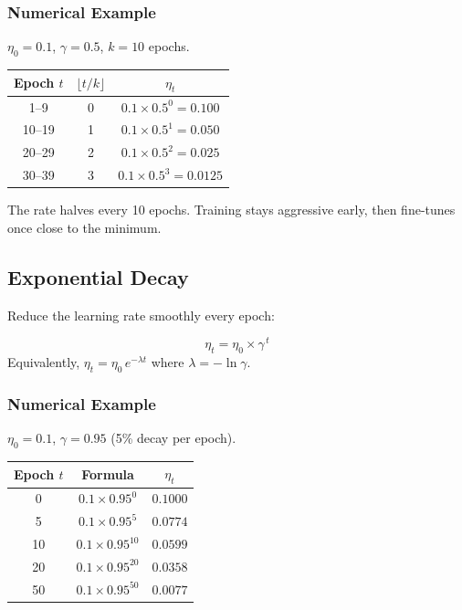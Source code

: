 \documentclass[12pt, a4paper]{article}
\newif\ifstudentmode
\newcommand{\sol}[2][6cm]{%
  \ifstudentmode\underline{\hspace{#1}}\else{#2}\fi}
\theoremstyle{definition}
\begin{document}
\subsubsection*{Numerical Example}

$\eta_0 = 0.1$, \; $\gamma = 0.5$, \; $k = 10$ epochs.

\begin{center}
\renewcommand{\arraystretch}{1.3}
\begin{tabular}{ccc}
\toprule
Epoch $t$ & $\lfloor t/k \rfloor$ & $\eta_t$ \\
\midrule
1--9   & 0 & $0.1 \times 0.5^0 = \sol[3cm]{0.100}$ \\
10--19 & 1 & $0.1 \times 0.5^1 = \sol[3cm]{0.050}$ \\
20--29 & 2 & $0.1 \times 0.5^2 = \sol[3cm]{0.025}$ \\
30--39 & 3 & $0.1 \times 0.5^3 = \sol[3cm]{0.0125}$ \\
\bottomrule
\end{tabular}
\end{center}

The rate halves every 10 epochs.  Training stays aggressive early, then
fine-tunes once close to the minimum.

\subsection{Exponential Decay}

Reduce the learning rate smoothly every epoch:

\begin{resultbox}
\[
  \eta_t = \eta_0 \times \gamma^{\,t}
\]
Equivalently, $\eta_t = \eta_0 \, e^{-\lambda t}$ where $\lambda = -\ln \gamma$.
\end{resultbox}

\subsubsection*{Numerical Example}

$\eta_0 = 0.1$, \; $\gamma = 0.95$ (5\% decay per epoch).

\begin{center}
\renewcommand{\arraystretch}{1.3}
\begin{tabular}{ccc}
\toprule
Epoch $t$ & Formula & $\eta_t$ \\
\midrule
0  & $0.1 \times 0.95^{0}$  & $\sol[3cm]{0.1000}$ \\
5  & $0.1 \times 0.95^{5}$  & $\sol[3cm]{0.0774}$ \\
10 & $0.1 \times 0.95^{10}$ & $\sol[3cm]{0.0599}$ \\
20 & $0.1 \times 0.95^{20}$ & $\sol[3cm]{0.0358}$ \\
50 & $0.1 \times 0.95^{50}$ & $\sol[3cm]{0.0077}$ \\
\bottomrule
\end{tabular}
\end{center}
\end{document}
